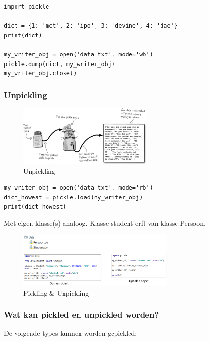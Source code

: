 \documentclass{article}
\begin{document}
\begin{verbatim}
import pickle

dict = {1: 'mct', 2: 'ipo', 3: 'devine', 4: 'dae'}
print(dict)

my_writer_obj = open('data.txt', mode='wb')
pickle.dump(dict, my_writer_obj)
my_writer_obj.close()
\end{verbatim}

\subsubsection{Unpickling}

\begin{figure}[H]
    \centering
    \includegraphics[width=0.6\textwidth]{unpickling.png}
    \caption{Unpickling}
\end{figure}

\begin{verbatim}
my_writer_obj = open('data.txt', mode='rb')
dict_howest = pickle.load(my_writer_obj)
print(dict_howest)
\end{verbatim}

Met eigen klasse(s) analoog. Klasse student erft van klasse Persoon.

\begin{figure}[H]
    \centering
    \includegraphics[width=0.7\textwidth]{unpickling2.png}
    \caption{Pickling \& Unpickling}
\end{figure}

\subsubsection{Wat kan pickled en unpickled worden?}

De volgende types kunnen worden gepickled:
\end{document}
